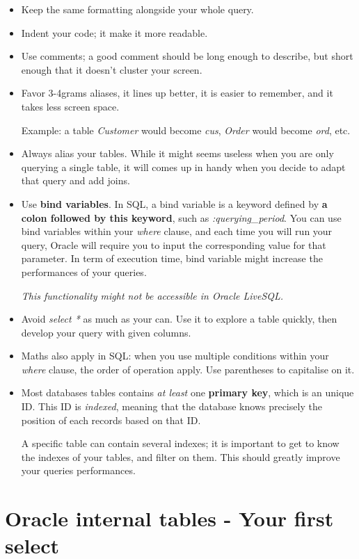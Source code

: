 \documentclass[12pt, letterpaper]{report}
\begin{document}
\begin{itemize}
	\item Keep the same formatting alongside your whole query.
	\item Indent your code; it make it more readable.
	\item Use comments; a good comment should be long enough to describe, but short enough that it doesn't cluster your screen.
	\item Favor 3-4grams aliases, it lines up better, it is easier to remember, and it takes less screen space.
	
	Example: a table \textit{Customer} would become \textit{cus}, \textit{Order} would become \textit{ord}, etc.
	\item Always alias your tables. While it might seems useless when you are only querying a single table, it will comes up in handy when you decide to adapt that query and add joins.
	\item Use \textbf{bind variables}. In SQL, a bind variable is a keyword defined by \textbf{a colon followed by this keyword}, such as \textit{:querying\_period}.
	You can use bind variables within your \textit{where} clause, and each time you will run your query, Oracle will require you to input the corresponding value for that parameter.
	In term of execution time, bind variable might increase the performances of your queries.

	\textit{This functionality might not be accessible in Oracle LiveSQL.}
	
	\item Avoid \textit{select *} as much as your can. Use it to explore a table quickly, then develop your query with given columns.
	\item Maths also apply in SQL: when you use multiple conditions within your \textit{where} clause, the order of operation apply. Use parentheses to capitalise on it.
	\item Most databases tables contains  \textit{at least} one \textbf{primary key}, which is an unique ID. This ID is \textit{indexed}, meaning that the database knows precisely the position of each records based on that ID.
	
	A specific table can contain several indexes; it is important to get to know the indexes of your tables, and filter on them. This should greatly improve your queries performances.
\end{itemize}

\section{Oracle internal tables - Your first select}
\end{document}
